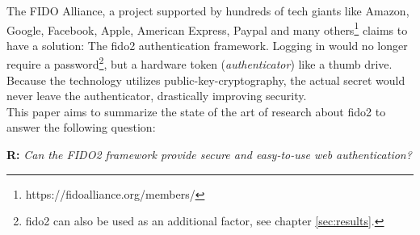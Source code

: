 The FIDO Alliance, a project supported by hundreds of tech giants like Amazon, Google, Facebook, Apple, American Express, Paypal and many others\footnote{https://fidoalliance.org/members/} claims to have a solution: The \ac{fido2} authentication framework. Logging in would no longer require a password\footnote{\ac{fido2} can also be used as an additional factor, see chapter \ref{sec:results}.}, but a hardware token (\emph{authenticator}) like a thumb drive. Because the technology utilizes public-key-cryptography, the actual secret would never leave the authenticator, drastically improving security.\\
This paper aims to summarize the state of the art of research about \ac{fido2} to answer the following question:


\begin{displayquote}
    \textbf{R:} \emph{Can the FIDO2 framework provide secure and easy-to-use web authentication?}
\end{displayquote}